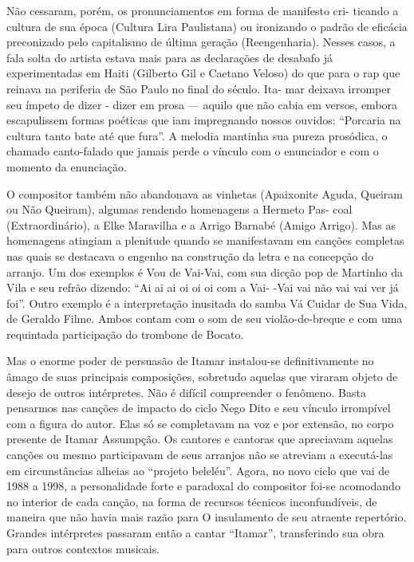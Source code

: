 Não cessaram, porém, os pronunciamentos em forma de manifesto cri-
ticando a cultura de sua época (Cultura Lira Paulistana) ou ironizando o
padrão de eficácia preconizado pelo capitalismo de última geração
(Reengenharia). Nesses casos, a fala solta do artista estava mais para
as declarações de desabafo já experimentadas em Haiti (Gilberto Gil e
Caetano Veloso) do que para o rap que reinava na periferia de São Paulo
no final do século. Ita- mar deixava irromper seu ímpeto de dizer -
dizer em prosa --- aquilo que não cabia em versos, embora escapulissem
formas poéticas que iam impregnando nossos ouvidos: ``Porcaria na
cultura tanto bate até que fura''. A melodia mantinha sua pureza
prosódica, o chamado canto-falado que jamais perde o vínculo com o
enunciador e com o momento da enunciação.

O compositor também não abandonava as vinhetas (Apaixonite Aguda,
Queiram ou Não Queiram), algumas rendendo homenagens a Hermeto Pas- coal
(Extraordinário), a Elke Maravilha e a Arrigo Barnabé (Amigo Arrigo).
Mas as homenagens atingiam a plenitude quando se manifestavam em canções
completas nas quais se destacava o engenho na construção da letra e na
concepção do arranjo. Um dos exemplos é Vou de Vai-Vai, com sua dicção
pop de Martinho da Vila e seu refrão dizendo: ``Ai ai ai oi oi oi com a
Vai- -Vai vai não vai vai ver já foi''. Outro exemplo é a interpretação
inusitada do samba Vá Cuidar de Sua Vida, de Geraldo Filme. Ambos contam
com o som de seu violão-de-breque e com uma requintada participação do
trombone de Bocato.

Mas o enorme poder de persuasão de Itamar instalou-se definitivamente no
âmago de suas principais composições, sobretudo aquelas que viraram
objeto de desejo de outros intérpretes. Não é difícil compreender o
fenômeno. Basta pensarmos nas canções de impacto do ciclo Nego Dito e
seu vínculo irrompível com a figura do autor. Elas só se completavam na
voz e por extensão, no corpo presente de Itamar Assumpção. Os cantores e
cantoras que apreciavam aquelas canções ou mesmo participavam de seus
arranjos não se atreviam a executá-las em circunstâncias alheias ao
``projeto beleléu''. Agora, no novo ciclo que vai de 1988 a 1998, a
personalidade forte e paradoxal do compositor foi-se acomodando no
interior de cada canção, na forma de recursos técnicos inconfundíveis,
de maneira que não havia mais razão para O insulamento de seu atraente
repertório. Grandes intérpretes passaram então a cantar ``Itamar'',
transferindo sua obra para outros contextos musicais.


